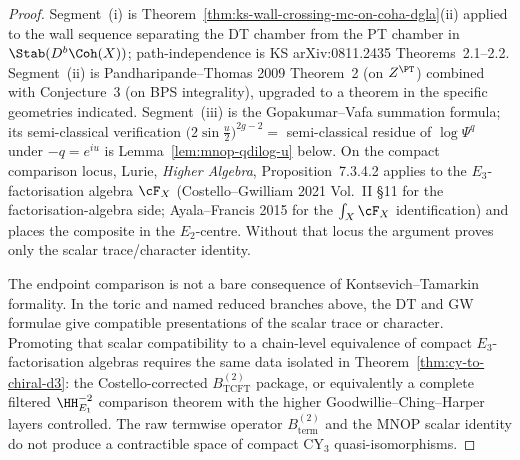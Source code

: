 \begin{proof}
Segment~(i) is Theorem~\ref{thm:ks-wall-crossing-mc-on-coha-dgla}(ii)
applied to the wall sequence separating the DT chamber from the PT
chamber in $\Stab(D^b\Coh(X))$; path-independence is KS
\textup{arXiv:0811.2435} Theorems~2.1--2.2. Segment~(ii) is
Pandharipande--Thomas 2009 Theorem~2 (on $Z^{\PT}$) combined with
Conjecture~3 (on BPS integrality), upgraded to a theorem in the
specific geometries indicated. Segment~(iii) is the Gopakumar--Vafa
summation formula; its semi-classical verification
$\bigl(2\sin\tfrac{u}{2}\bigr)^{2g-2} =$ semi-classical residue of
$\log \Psi^{q}$ under $-q = e^{iu}$ is Lemma~\ref{lem:mnop-qdilog-u}
below. On the compact comparison locus, Lurie, \emph{Higher Algebra},
Proposition~7.3.4.2 applies to the $E_3$-factorisation algebra $\cF_X$
(Costello--Gwilliam 2021 Vol.~II \S11 for the factorisation-algebra
side; Ayala--Francis 2015 for the $\int_{X} \cF_X$ identification) and
places the composite in the $E_2$-centre. Without that locus the
argument proves only the scalar trace/character identity.

The endpoint comparison is not a bare consequence of
Kontsevich--Tamarkin formality. In the toric and named reduced
branches above, the DT and GW formulae give compatible presentations
of the scalar trace or character. Promoting
that scalar compatibility to a chain-level equivalence of compact
$E_3$-factorisation algebras requires the same data isolated in
Theorem~\ref{thm:cy-to-chiral-d3}: the Costello-corrected
$B^{(2)}_{\mathrm{TCFT}}$ package, or equivalently a complete filtered
$\HH^{-2}_{E_1}$ comparison theorem with the higher
Goodwillie--Ching--Harper layers controlled. The raw termwise
operator $B^{(2)}_{\mathrm{term}}$ and the MNOP scalar identity do not
produce a contractible space of compact CY$_3$ quasi-isomorphisms.
\end{proof}

